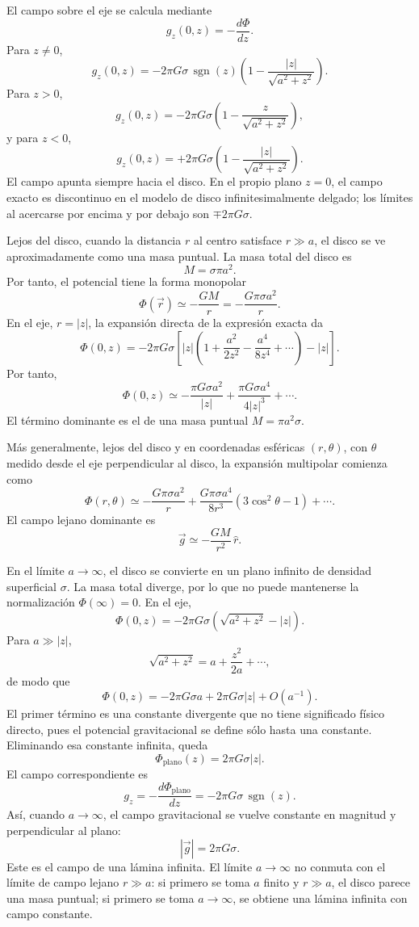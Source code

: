 \documentclass[a4paper]{article}
\begin{document}
El campo sobre el eje se calcula mediante
$$
g_z(0,z)=-\frac{d\Phi}{dz}.
$$
Para $z\neq 0$,
$$
g_z(0,z)=
-2\pi G\sigma\,\operatorname{sgn}(z)
\left(
1-\frac{|z|}{\sqrt{a^2+z^2}}
\right).
$$
Para $z>0$,
$$
g_z(0,z)=
-2\pi G\sigma
\left(
1-\frac{z}{\sqrt{a^2+z^2}}
\right),
$$
y para $z<0$,
$$
g_z(0,z)=
+2\pi G\sigma
\left(
1-\frac{|z|}{\sqrt{a^2+z^2}}
\right).
$$
El campo apunta siempre hacia el disco. En el propio plano $z=0$, el campo exacto es discontinuo en el modelo de disco infinitesimalmente delgado; los límites al acercarse por encima y por debajo son $\mp 2\pi G\sigma$.

Lejos del disco, cuando la distancia $r$ al centro satisface $r\gg a$, el disco se ve aproximadamente como una masa puntual. La masa total del disco es
$$
M=\sigma\pi a^2.
$$
Por tanto, el potencial tiene la forma monopolar
$$
\Phi(\vec r)\simeq -\frac{GM}{r}
=-\frac{G\pi\sigma a^2}{r}.
$$
En el eje, $r=|z|$, la expansión directa de la expresión exacta da
$$
\Phi(0,z)=
-2\pi G\sigma
\left[
|z|\left(1+\frac{a^2}{2z^2}-\frac{a^4}{8z^4}+\cdots\right)-|z|
\right].
$$
Por tanto,
$$
\Phi(0,z)\simeq
-\frac{\pi G\sigma a^2}{|z|}
+\frac{\pi G\sigma a^4}{4|z|^3}
+\cdots.
$$
El término dominante es el de una masa puntual $M=\pi a^2\sigma$.

Más generalmente, lejos del disco y en coordenadas esféricas $(r,\theta)$, con $\theta$ medido desde el eje perpendicular al disco, la expansión multipolar comienza como
$$
\Phi(r,\theta)\simeq
-\frac{G\pi\sigma a^2}{r}
+
\frac{G\pi\sigma a^4}{8r^3}
\left(3\cos^2\theta-1\right)
+\cdots.
$$
El campo lejano dominante es
$$
\vec g\simeq -\frac{GM}{r^2}\,\hat r.
$$

En el límite $a\to\infty$, el disco se convierte en un plano infinito de densidad superficial $\sigma$. La masa total diverge, por lo que no puede mantenerse la normalización $\Phi(\infty)=0$. En el eje,
$$
\Phi(0,z)=-2\pi G\sigma\left(\sqrt{a^2+z^2}-|z|\right).
$$
Para $a\gg |z|$,
$$
\sqrt{a^2+z^2}=a+\frac{z^2}{2a}+\cdots,
$$
de modo que
$$
\Phi(0,z)=
-2\pi G\sigma a
+2\pi G\sigma |z|
+O(a^{-1}).
$$
El primer término es una constante divergente que no tiene significado físico directo, pues el potencial gravitacional se define sólo hasta una constante. Eliminando esa constante infinita, queda
$$
\Phi_{\text{plano}}(z)=2\pi G\sigma |z|.
$$
El campo correspondiente es
$$
g_z=-\frac{d\Phi_{\text{plano}}}{dz}
=-2\pi G\sigma\,\operatorname{sgn}(z).
$$
Así, cuando $a\to\infty$, el campo gravitacional se vuelve constante en magnitud y perpendicular al plano:
$$
|\vec g|=2\pi G\sigma.
$$
Este es el campo de una lámina infinita. El límite $a\to\infty$ no conmuta con el límite de campo lejano $r\gg a$: si primero se toma $a$ finito y $r\gg a$, el disco parece una masa puntual; si primero se toma $a\to\infty$, se obtiene una lámina infinita con campo constante.
\end{document}
